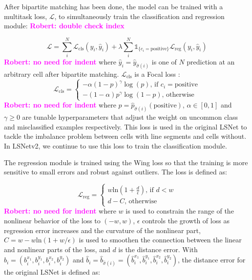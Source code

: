 \documentclass[journal]{IEEEtran}
\newcommand{\commentR}[1]{\textbf{\textcolor{magenta}{Robert: #1}}}
\begin{document}
After bipartite matching has been done, the model can be trained with a multitask loss, $\mathcal{L}$, to simultaneously train the classification and regression module: \commentR{double check index}

\begin{equation} \label{multitask_training_loss}
\mathcal{L} = \sum_i^N\mathcal{L}_{\text{cls}}(y_i, \hat{y}_i) + \lambda \sum_i^N\mathds{1}_{\{c_i=\text{positive}\}}\mathcal{L}_\text{reg}(y_i, \hat{y}_i) 
\end{equation}
\commentR{no need for indent}
where $\hat{y}_i = \hat{y}_{\hat{\sigma}(i)}$ is one of $N$ prediction at an arbitrary cell after bipartite matching. $\mathcal{L}_{\text{cls}}$ is a Focal loss \cite{focal_loss}:
\begin{equation}
  \mathcal{L}_{\text{cls}} =
    \begin{cases}
      -\alpha (1 - p)^\gamma \log(p) \text{,  if  } c_i=\text{positive} \\
      -(1 - \alpha)p^\gamma \log(1-p) \text{,  otherwise} 
    \end{cases}       
\end{equation}
\commentR{no need for indent}
where $p=\hat{p}_{\hat{\sigma}(i)}(\text{positive})$, $\alpha \in [0, 1]$ and $\gamma \geq 0$ are tunable hyperparameters that adjust the weight on uncommon class and misclassified examples respectively. This loss is used in the original LSNet to tackle the imbalance problem between cells with line segments and cells without. In LSNetv2, we continue to use this loss to train the classification module.

The regression module is trained using the Wing loss \cite{wing_loss} so that the training is more sensitive to small errors and robust against outliers. The loss is defined as:

\begin{equation}
  \mathcal{L}_{\text{reg}} =
    \begin{cases}
      w \text{ln} (1 + \frac{d}{\epsilon}) \text{, if } d < w \\
      d - C \text{,  otherwise}
    \end{cases}       
\end{equation}
\commentR{no need for indent}
where $w$ is used to constrain the range of the nonlinear behavior of the loss to $(-w, w)$, $\epsilon$ controls the growth of loss as regression error increases and the curvature of the nonlinear part, $C = w - w\text{ln}(1 + w / \epsilon)$ is used to smoothen the connection between the linear and nonlinear parts of the loss, and $d$ is the distance error. With $b_i = (b_i^{x_1}, b_i^{y_1}, b_i^{x_2}, b_i^{y_2})$ and $\hat{b}_i = \hat{b}_{\hat{\sigma}(i)} = (\hat{b}_i^{x_1}, \hat{b}_i^{y_1}, \hat{b}_i^{x_2}, \hat{b}_i^{y_2})$, the distance error for the original LSNet is defined as:
\end{document}
